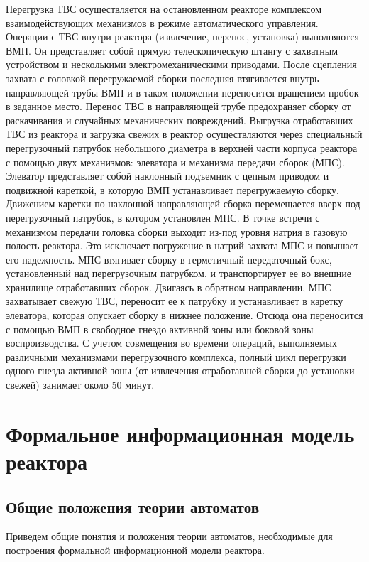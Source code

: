 Перегрузка ТВС осуществляется на остановленном реакторе комплексом взаимодействующих механизмов в режиме автоматического управления.
Операции с ТВС внутри реактора (извлечение, перенос, установка) выполняются ВМП.
Он представляет собой прямую телескопическую штангу с захватным устройством и несколькими электромеханическими приводами.
После сцепления захвата с головкой перегружаемой сборки последняя втягивается внутрь направляющей трубы ВМП и в таком положении переносится вращением пробок в заданное место.
Перенос ТВС в направляющей трубе предохраняет сборку от раскачивания и случайных механических повреждений.
Выгрузка отработавших ТВС из реактора и загрузка свежих в реактор осуществляются через специальный перегрузочный патрубок небольшого диаметра в верхней части корпуса реактора с помощью двух механизмов: элеватора и механизма передачи сборок (МПС).
Элеватор представляет собой наклонный подъемник с цепным приводом и подвижной кареткой, в которую ВМП устанавливает перегружаемую сборку.
Движением каретки по наклонной направляющей сборка перемещается вверх под перегрузочный патрубок, в котором установлен МПС.
В точке встречи с механизмом передачи головка сборки выходит из-под уровня натрия в газовую полость реактора.
Это исключает погружение в натрий захвата МПС и повышает его надежность.
МПС втягивает сборку в герметичный передаточный бокс, установленный над перегрузочным патрубком, и транспортирует ее во внешние хранилище отработавших сборок.
Двигаясь в обратном направлении, МПС захватывает свежую ТВС, переносит ее к патрубку и устанавливает в каретку элеватора, которая опускает сборку в нижнее положение.
Отсюда она переносится с помощью ВМП в свободное гнездо активной зоны или боковой зоны воспроизводства. 
С учетом совмещения во времени операций, выполняемых различными механизмами перегрузочного комплекса, полный цикл перегрузки одного гнезда активной зоны (от извлечения отработавшей сборки до установки свежей) занимает около 50 минут.
\cite{BH}

\section{Формальное информационная модель реактора} \label{formal-model}
\subsection{Общие положения теории автоматов}\label{automata-theory}

Приведем общие понятия и положения теории автоматов, необходимые для построения формальной информационной модели реактора.

